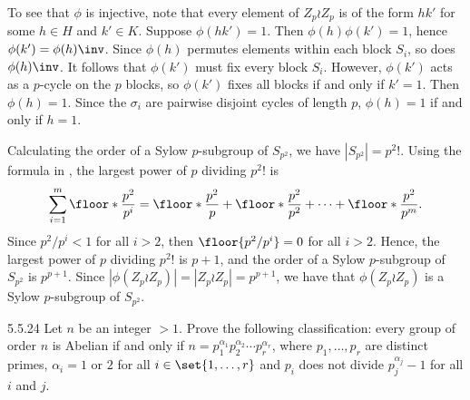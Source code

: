 \begin{solenum}
    To see that $\phi$ is injective, note that every element of $Z_p \wr Z_p$ is of the form $hk'$ for some $h \in H$ and $k' \in K$.
    Suppose $\phi(hk') = 1$.
    Then $\phi(h)\phi(k') = 1$, hence $\phi(k') = \phi(h)\inv$.
    Since $\phi(h)$ permutes elements within each block $S_i$, so does $\phi(h)\inv$.
    It follows that $\phi(k')$ must fix every block $S_i$.
    However, $\phi(k')$ acts as a $p$-cycle on the $p$ blocks, so $\phi(k')$ fixes all blocks if and only if $k' = 1$.
    Then $\phi(h) = 1$.
    Since the $\sigma_i$ are pairwise disjoint cycles of length $p$, $\phi(h) = 1$ if and only if $h = 1$.

    Calculating the order of a Sylow $p$-subgroup of $S_{p^2}$, we have $|S_{p^2}| = p^2!$.
    Using the formula in , the largest power of $p$ dividing $p^2!$ is
    \[
        \sum_{i=1}^m \floor*{\frac{p^2}{p^i}} = \floor*{\frac{p^2}{p}} + \floor*{\frac{p^2}{p^2}} + \cdots + \floor*{\frac{p^2}{p^m}}.
    \]
    Since $p^2/p^i < 1$ for all $i > 2$, then $\floor{p^2/p^i} = 0$ for all $i > 2$.
    Hence, the largest power of $p$ dividing $p^2!$ is $p + 1$, and the order of a Sylow $p$-subgroup of $S_{p^2}$ is $p^{p + 1}$.
    Since $|\phi(Z_p \wr Z_p)| = |Z_p \wr Z_p| = p^{p + 1}$, we have that $\phi(Z_p \wr Z_p)$ is a Sylow $p$-subgroup of $S_{p^2}$.
\end{solenum}

\begin{exercise}{5.5.24}
    Let $n$ be an integer $> 1$.
	Prove the following classification: every group of order $n$ is Abelian if and only if $n = p_1^{\alpha_1} p_2^{\alpha_2} \cdots p_r^{\alpha_r}$, where $p_1, \ldots, p_r$ are distinct primes, $\alpha_i = 1$ or $2$ for all $i \in \set{1, \ldots, r}$ and $p_i$ does not divide $p_j^{\alpha_j} - 1$ for all $i$ and $j$.
    
\end{exercise}

